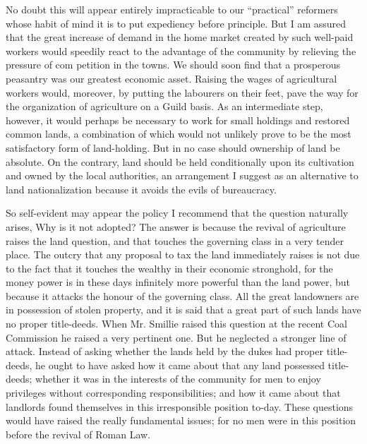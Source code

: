 \documentclass{book}
\begin{document}
No doubt this will appear entirely impracticable to our “practical” reformers whose habit of mind it is to put expediency before principle. But I am assured that the great increase of demand in the home market created by such well-paid workers would speedily react to the advantage of the community by relieving the pressure of com petition in the towns. We should soon find that a prosperous peasantry was our greatest economic asset. Raising the wages of agricultural workers would, moreover, by putting the labourers on their feet, pave the way for the organization of agriculture on a Guild basis. As an intermediate step, however, it would perhaps be necessary to work for small holdings and restored common lands, a combination of which would not unlikely prove to be the most satisfactory form of land-holding. But in no case should ownership of land be absolute. On the contrary, land should be held conditionally upon its cultivation and owned by the local authorities, an arrangement I suggest as an alternative to land nationalization because it avoids the evils of bureaucracy.

So self-evident may appear the policy I recommend that the question naturally arises, Why is it not adopted? The answer is because the revival of agriculture raises the land question, and that touches the governing class in a very tender place. The outcry that any proposal to tax the land immediately raises is not due to the fact that it touches the wealthy in their economic stronghold, for the money power is in these days infinitely more powerful than the land power, but because it attacks the honour of the governing class. All the great landowners are in possession of stolen property, and it is said that a great part of such lands have no proper title-deeds. When Mr. Smillie raised this question at the recent Coal Commission he raised a very pertinent one. But he neglected a stronger line of attack. Instead of asking whether the lands held by the dukes had proper title-deeds, he ought to have asked how it came about that any land possessed title-deeds; whether it was in the interests of the community for men to enjoy privileges without corresponding responsibilities; and how it came about that landlords found themselves in this irresponsible position to-day. These questions would have raised the really fundamental issues; for no men were in this position before the revival of Roman Law.
\end{document}
